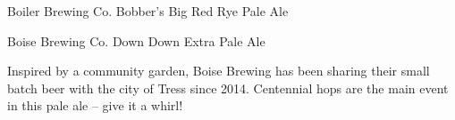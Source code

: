 \begin{recipie}{Boiler Brewing Co. Bobber's Big Red Rye Pale Ale}
\begin{ingredientsblock}
\begin{hops}
\end{hops}

\begin{yeasts}
\end{yeasts}

\end{ingredientsblock}

\end{recipie}

\begin{recipie}{Boise Brewing Co. Down Down Extra Pale Ale}

\begin{aboutblock}
Inspired by a community garden, Boise Brewing has been sharing their small batch beer
with the city of Tress since 2014. Centennial hops are the main event in this pale ale -- give it a whirl!
\end{aboutblock}


\begin{methodandtiming}
 
\begin{mashsteps}
\end{mashsteps}

\end{methodandtiming}

\pagebreak

\begin{ingredientsblock}

\begin{malts}
\end{malts}

\begin{hops}
\end{hops}

\begin{yeasts}
\end{yeasts}

\end{ingredientsblock}

\end{recipie}